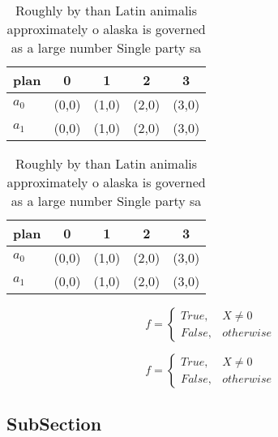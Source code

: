 \documentclass[a4paper]{article}
\begin{document}
\begin{table}
\begin{adjustbox}{width=0.5\columnwidth}
\begin{tabular}{|l|l|l|l|l|}
\hline
\textbf{plan} & \multicolumn{1}{c|}{\textbf{0}} & \multicolumn{1}{c|}{\textbf{1}} & \multicolumn{1}{c|}{\textbf{2}} & \multicolumn{1}{c|}{\textbf{3}} \\ \hline
\textbf{$a_0$}  & (0,0) & (1,0) & (2,0) & (3,0) \\ \hline
\textbf{$a_1$}  & (0,0) & (1,0) & (2,0) & (3,0) \\ \hline
\end{tabular}
\end{adjustbox}
\caption{Roughly by than Latin animalis approximately o alaska is governed as a large number Single party sa
}
\end{table}

\begin{table}
\begin{adjustbox}{width=0.5\columnwidth}
\begin{tabular}{|l|l|l|l|l|}
\hline
\textbf{plan} & \multicolumn{1}{c|}{\textbf{0}} & \multicolumn{1}{c|}{\textbf{1}} & \multicolumn{1}{c|}{\textbf{2}} & \multicolumn{1}{c|}{\textbf{3}} \\ \hline
\textbf{$a_0$}  & (0,0) & (1,0) & (2,0) & (3,0) \\ \hline
\textbf{$a_1$}  & (0,0) & (1,0) & (2,0) & (3,0) \\ \hline
\end{tabular}
\end{adjustbox}
\caption{Roughly by than Latin animalis approximately o alaska is governed as a large number Single party sa
}
\end{table}

\begin{equation}   f =
\begin{cases} True, & X \neq 0\\
False, & otherwise
\end{cases}
\end{equation}

\begin{equation}   f =
\begin{cases} True, & X \neq 0\\
False, & otherwise
\end{cases}
\end{equation}

\subsection{SubSection}
\end{document}

